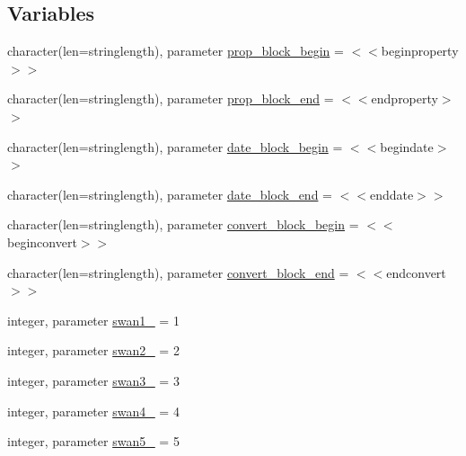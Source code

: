 \subsection*{Variables}
\begin{DoxyCompactItemize}
\item 
character(len=stringlength), parameter \mbox{\hyperlink{namespacemodulehdf5toasciiandbin_a4a45dd20b3087c4f7591c88fc4463ab7}{prop\+\_\+block\+\_\+begin}} = \textquotesingle{}$<$$<$beginproperty$>$$>$\textquotesingle{}
\item 
character(len=stringlength), parameter \mbox{\hyperlink{namespacemodulehdf5toasciiandbin_ad076cbdf7d5abeebbf0c5eb66400d89d}{prop\+\_\+block\+\_\+end}} = \textquotesingle{}$<$$<$endproperty$>$$>$\textquotesingle{}
\item 
character(len=stringlength), parameter \mbox{\hyperlink{namespacemodulehdf5toasciiandbin_a6b2e6aa427edbd015ad91b9036b78520}{date\+\_\+block\+\_\+begin}} = \textquotesingle{}$<$$<$begindate$>$$>$\textquotesingle{}
\item 
character(len=stringlength), parameter \mbox{\hyperlink{namespacemodulehdf5toasciiandbin_ae29bb64f764920d560527391a2d97a1f}{date\+\_\+block\+\_\+end}} = \textquotesingle{}$<$$<$enddate$>$$>$\textquotesingle{}
\item 
character(len=stringlength), parameter \mbox{\hyperlink{namespacemodulehdf5toasciiandbin_a6740560c9f2f911f85b3ec6172db1644}{convert\+\_\+block\+\_\+begin}} = \textquotesingle{}$<$$<$beginconvert$>$$>$\textquotesingle{}
\item 
character(len=stringlength), parameter \mbox{\hyperlink{namespacemodulehdf5toasciiandbin_a7016ca478716e59fb0f7cdb3048a2378}{convert\+\_\+block\+\_\+end}} = \textquotesingle{}$<$$<$endconvert$>$$>$\textquotesingle{}
\item 
integer, parameter \mbox{\hyperlink{namespacemodulehdf5toasciiandbin_af23b86d1609b710e8df5f28714b04bbf}{swan1\+\_\+}} = 1
\item 
integer, parameter \mbox{\hyperlink{namespacemodulehdf5toasciiandbin_a16b22f5b41bd511f717c0a4f238a254a}{swan2\+\_\+}} = 2
\item 
integer, parameter \mbox{\hyperlink{namespacemodulehdf5toasciiandbin_a5b91bc93f3d72b0cb8be873dcca9bd34}{swan3\+\_\+}} = 3
\item 
integer, parameter \mbox{\hyperlink{namespacemodulehdf5toasciiandbin_a20d22b21a0e4df1d9460e82a3de204d9}{swan4\+\_\+}} = 4
\item 
integer, parameter \mbox{\hyperlink{namespacemodulehdf5toasciiandbin_a5a4a1a187cb7f1814d812807439ec637}{swan5\+\_\+}} = 5

\end{DoxyCompactItemize}
